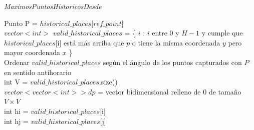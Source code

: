 \begin{algorithm}[H]
	\caption{\textit{MaximosPuntosHistoricosDesde}}
	Punto P = $historical\_places$[$ref\_point$] \\

    $vector<int>$ $valid\_historical\_places$ = \{ $i$ : $i$ entre 0 y $H-1$ y cumple que $historical\_places$[i] está más arriba que $p$ o tiene la misma coordenada $y$ pero mayor coordenada $x$ \} \\
    
    Ordenar $valid\_historical\_places$ según el ángulo de los puntos capturados con $P$ en sentido antihorario \\
    
    int V = $valid\_historical\_places$.size() \\
    $vector< vector<int> > dp$ = vector bidimensional relleno de 0 de tamaño $V \times V$ \\

     {
        int hi = $valid\_historical\_places$[i] \\
         {
            int hj = $valid\_historical\_places$[j] \\
        }
    }

\end{algorithm}


